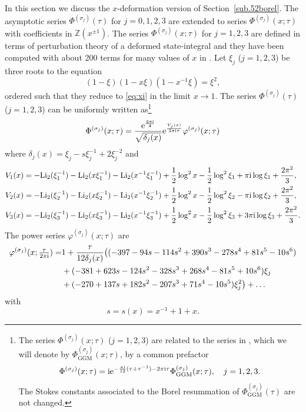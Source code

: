 \documentclass[12pt,reqno]{amsart}
\theoremstyle{definition}
\def\IZ{\mathbb{Z}}
\def\s{\sigma}
\def\Li{\mathrm{Li}}
\def\ri{\mathrm{i}}
\def\re{{\rm e}}
\def\ri{{\rm i}}
\def\IZ{\mathbb{Z}}
\newcommand{\nn}{\nonumber \\}
\begin{document}
In this section we discuss the $x$-deformation version of Section~\ref{sub.52borel}. 
The asymptotic series $\Phi^{(\s_j)}(\tau)$ for $j=0,1,2,3$ are extended to
series $\Phi^{(\s_j)}(x;\tau)$ with coefficients in $\IZ(x^{\pm 1})$. The
series $\Phi^{(\s_j)}(x;\tau)$ for $j=1,2,3$ are defined in terms of
perturbation theory of a deformed state-integral \cite{AK} and they
have been computed with about 200 terms for many values of $x$ in
\cite{GGM:peacock}.  Let $\xi_j$ ($j=1,2,3$) be three roots to the
equation
\begin{equation}
  (1-\xi)(1-x\xi)(1-x^{-1}\xi) = \xi^2,
\end{equation}
ordered such that they reduce to \eqref{eq:xi} in the limit
$x\rightarrow 1$. The series $\Phi^{(\s_j)}(\tau)$ ($j=1,2,3$) can be
uniformly written as\footnote{The series $\Phi^{(\s_j)}(x;\tau)$
  ($j=1,2,3$) are related to the series in
  \cite{GGM:resurgent,GGM:peacock}, which we will denote by
  $\Phi^{(\s_j)}_{\text{GGM}}(x;\tau)$, by a common prefactor
  \begin{equation}
    \Phi^{(\s_j)}(x;\tau) = \ri
    \re^{-\frac{\pi\ri}{12}(\tau+\tau^{-1})-2\pi\ri\tau}
    \Phi^{(\s_j)}_{\text{GGM}}(x;\tau),\quad j=1,2,3.
  \end{equation}
  The Stokes constants associated to the Borel resummation of
  $\Phi^{(\s_j)}_{\text{GGM}}(\tau)$ are not changed.}  
\begin{equation}
  \Phi^{(\s_j)}(x;\tau) = \frac{\re^{\frac{3\pi\ri}{4}}}{\sqrt{\delta_j(x)}}
    \re^{\frac{V_j(x)}{2\pi\ri\tau}} \varphi^{(\s_j)}(x;\tau)
\end{equation}
where $\delta_j(x) = \xi_j-s \xi_j^{-1}+2 \xi_j^{-2}$
and
\begin{equation}
\label{Vx52}
  \begin{aligned}
    V_1(x) &=
      -\Li_2(\xi_1^{-1})-\Li_2(x\xi_1^{-1})-\Li_2(x^{-1}\xi_1^{-1})
      +\frac{1}{2}\log^2 x -\frac{1}{2}\log^2 \xi_1
      +\pi\ri\log\xi_1+\frac{2\pi^2}{3},\\
    V_2(x) &=
      -\Li_2(\xi_2^{-1})-\Li_2(x\xi_2^{-1})-\Li_2(x^{-1}\xi_2^{-1})
      +\frac{1}{2}\log^2 x -\frac{1}{2}\log^2 \xi_2
      -\pi\ri\log\xi_2+\frac{2\pi^2}{3},\\
    V_3(x) &=
      -\Li_2(\xi_3^{-1})-\Li_2(x\xi_3^{-1})-\Li_2(x^{-1}\xi_3^{-1})
      +\frac{1}{2}\log^2 x -\frac{1}{2}\log^2 \xi_3
      +3\pi\ri\log\xi_3+\frac{2\pi^2}{3}.
  \end{aligned}
\end{equation}
The power series $\varphi^{(\s_j)}(x;\tau)$ are 
\begin{align}
  \varphi^{(\s_j)}(x;\tfrac{\tau}{2\pi\ri}) =
  &1 + \frac{\tau}{12\delta_j(x)}\big((-397 - 94 s - 114 s^2 + 390 s^3 - 278 s^4 + 81 s^5 - 10 s^6)\nn
  &+(-381 + 623 s - 124 s^2 - 328 s^3 + 268 s^4 - 81 s^5 + 10 s^6)
    \xi_j\nn
  &+(-270 + 137 s + 182 s^2 - 207 s^3 + 71 s^4 - 10 s^5) \xi_j^2
    \big)+\ldots
\end{align}
with
\begin{equation}
  s = s(x) = x^{-1}+1+x.
\end{equation}
\end{document}
